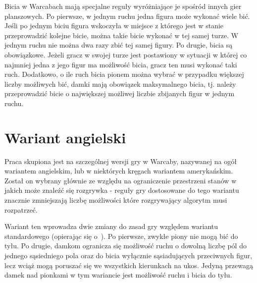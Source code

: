 Bicia w Warcabach mają specjalne reguły wyróżniające je spośród innych gier planszowych. Po pierwsze, w jednym ruchu jedna figura może wykonać wiele bić. Jeśli po jednym biciu figura wskoczyła w miejsce z którego jest w stanie przeprowadzić kolejne bicie, można takie bicie wykonać w tej samej turze. W jednym ruchu nie można dwa razy zbić tej samej figury. Po drugie, bicia są obowiązkowe. Jeżeli gracz w swojej turze jest postawiony w sytuacji w której co najmniej jedna z jego figur ma możliwość bicia, gracz ten musi wykonać taki ruch. Dodatkowo, o ile ruch bicia pionem można wybrać w przypadku większej liczby możliwych bić, damki mają obowiązek maksymalnego bicia, tj. należy przeprowadzić bicie o największej możliwej liczbie zbijanych figur w jednym ruchu.

\section{Wariant angielski}

\FloatBarrier

Praca skupiona jest na szczególnej wersji gry w Warcaby, nazywanej na ogół wariantem angielskim, lub w niektórych kręgach wariantem amerykańskim. Został on wybrany głównie ze względu na ograniczenie przestrzeni stanów w jakich może znaleźć się rozgrywka - reguły gry dostosowane do tego wariantu znacznie zmniejszają liczbę możliwości które rozgrywający algorytm musi rozpatrzeć.


Wariant ten wprowadza dwie zmiany do zasad gry względem wariantu standardowego (opierając się o~\cite{Gry}). Po pierwsze, zwykłe piony nie mogą bić do tyłu. Po drugie, damkom ogranicza się możliwość ruchu o dowolną liczbę pól do jednego sąsiedniego pola oraz do bicia wyłącznie sąsiadujących przeciwnych figur, lecz wciąż mogą poruszać się we wszystkich kierunkach na ukos. Jedyną przewagą damek nad pionkami w tym wariancie jest możliwość ruchu i bicia do tyłu.


